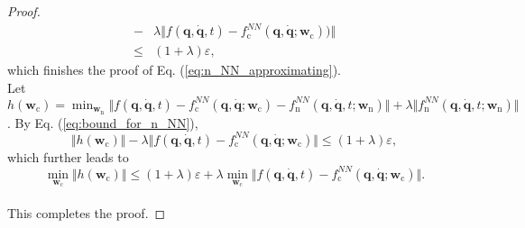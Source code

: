 \documentclass[aps,pre,reprint,superscriptaddress,nofootinbib,amsmath,amssymb]{revtex4-2}
\newcommand{\mat}[1]{\mathbf{#1}}
\newcommand{\q}{\mat{q}}
\newcommand{\qd}{\dot{\mat{q}}}
\begin{document}
\begin{proof}
\begin{align}
		\nonumber
		-&\lambda \Vert f(\q,\qd,t)-f_{\mathrm{c}}^{NN}(\q,\qd;\boldsymbol{w}_{\mathrm{c}})  )\Vert
		\\
		\label{eq:bound_for_n_NN}
		\le& (1+\lambda)\varepsilon,
	\end{align}
	which finishes the proof of Eq. (\ref{eq:n_NN_approximating}). 
	\\Let $h(\boldsymbol{w}_{\mathrm{c}})=\min_{\boldsymbol{w}_{\mathrm{n}}}\Vert f(\q,\qd,t)-f_{\mathrm{c}}^{NN}(\q,\qd;\boldsymbol{w}_{\mathrm{c}})-f_{\mathrm{n}}^{NN}(\q,\qd,t;\boldsymbol{w}_{\mathrm{n}})\Vert+\lambda \Vert f_{\mathrm{n}}^{NN}(\q,\qd,t;\boldsymbol{w}_{\mathrm{n}})\Vert$. By Eq. (\ref{eq:bound_for_n_NN}), 
	\begin{equation*}
		\Vert h(\boldsymbol{w}_{\mathrm{c}})\Vert -\lambda\Vert f(\q,\qd,t)-f_{\mathrm{c}}^{NN}(\q,\qd;\boldsymbol{w}_{\mathrm{c}})\Vert\le (1+\lambda)\varepsilon,
	\end{equation*}
	which further leads to 
	\begin{equation*}
		\min_{\boldsymbol{w}_{\mathrm{c}}}\Vert h(\boldsymbol{w}_{\mathrm{c}})\Vert \le (1+\lambda)\varepsilon+\lambda\min_{\boldsymbol{w}_{\mathrm{c}}}\Vert f(\q,\qd,t)-f_{\mathrm{c}}^{NN}(\q,\qd;\boldsymbol{w}_{\mathrm{c}})\Vert.
	\end{equation*}
	\\This completes the proof.
\end{proof}

\setcounter{secnumdepth}{2}
 
\end{document}
